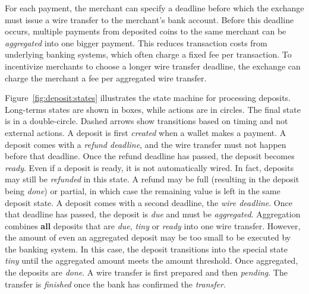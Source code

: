 For each payment, the merchant can specify a deadline before which the exchange
must issue a wire transfer to the merchant's bank account.  Before this
deadline occurs, multiple payments from deposited coins to the same merchant
can be \emph{aggregated} into one bigger payment.  This reduces transaction
costs from underlying banking systems, which often charge a fixed fee per
transaction.  To incentivize merchants to choose a longer wire transfer
deadline, the exchange can charge the merchant a fee per aggregated wire
transfer.

Figure~\ref{fig:deposit:states} illustrates the state machine for processing
deposits.  Long-terms states are shown in boxes, while actions are in circles.
The final state is in a double-circle.  Dashed arrows show transitions based
on timing and not external actions. A deposit is first {\em created} when a
wallet makes a payment.  A deposit comes with a {\em refund deadline}, and the
wire transfer must not happen before that deadline. Once the refund deadline
has passed, the deposit becomes {\em ready}.  Even if a deposit is ready, it
is not automatically wired. In fact, deposits may still be {\em refunded} in
this state.  A refund may be full (resulting in the deposit being {\em done})
or partial, in which case the remaining value is left in the same deposit
state. A deposit comes with a second deadline, the {\em wire deadline}. Once
that deadline has passed, the deposit is {\em due} and must be {\em
  aggregated}.  Aggregation combines {\bf all} deposits that are {\em due},
{\em tiny} or {\em ready} into one wire transfer.  However, the amount of even
an aggregated deposit may be too small to be executed by the banking
system. In this case, the deposit transitions into the special state {\em
  tiny} until the aggregated amount meets the amount threshold.  Once
aggregated, the deposits are {\em done}.  A wire transfer is first prepared
and then {\em pending}. The transfer is {\em finished} once the bank has
confirmed the {\em transfer}.

